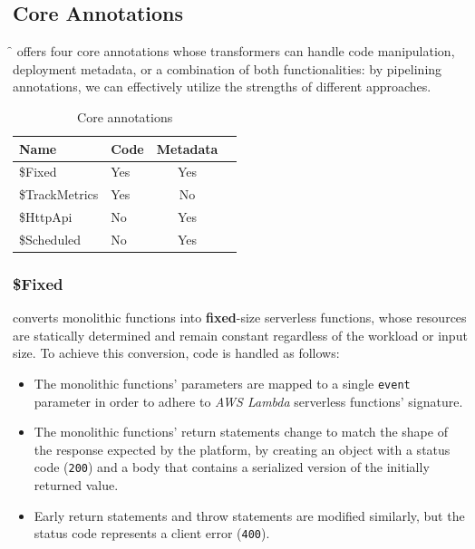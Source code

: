 \subsection{Core Annotations}

\f{} offers four core annotations whose transformers can handle code manipulation,
deployment metadata, or a combination of both functionalities:
by pipelining annotations, we can effectively utilize the strengths of different approaches.

\begin{table}[htbp]
    \centering
    \caption{Core annotations}
    \begin{tabular}{llcc}
        \toprule
        \textbf{Name} & \textbf{Code} & \textbf{Metadata} \\
        \midrule
        \$Fixed & Yes & Yes \\
        \$TrackMetrics & Yes & No \\
        \$HttpApi & No & Yes \\
        \$Scheduled & No & Yes \\
        \bottomrule
    \end{tabular}
\end{table}

\subsubsection{\$Fixed}
converts monolithic functions into \textbf{fixed}-size serverless functions,
whose resources are statically determined and remain constant regardless of the workload or input size.
To achieve this conversion, code is handled as follows:
\begin{itemize}
  \item The monolithic functions' parameters are mapped to a single \verb|event|
    parameter in order to adhere to \textit{AWS Lambda} serverless functions' signature.
  \item The monolithic functions' return statements change to match
    the shape of the response expected by the platform,
    by creating an object with a status code (\verb|200|)
    and a body that contains a serialized version of the initially returned value.
  \item Early return statements and throw statements are modified similarly,
    but the status code represents a client error (\verb|400|).
\end{itemize}

